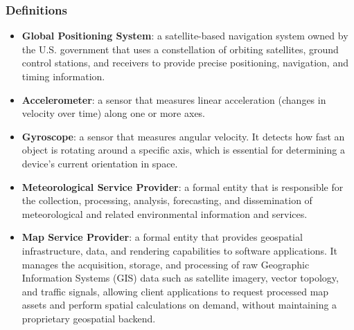 \subsubsection{Definitions}
\begin{itemize}
    \item \textbf{Global Positioning System}: a satellite-based navigation system owned by the U.S. government that uses a constellation of orbiting satellites, ground control stations, and receivers to provide precise positioning, navigation, and timing information.
    \item \textbf{Accelerometer}: a sensor that measures linear acceleration (changes in velocity over time) along one or more axes.
    \item \textbf{Gyroscope}: a sensor that measures angular velocity. It detects how fast an object is rotating around a specific axis, which is essential for determining a device’s current orientation in space.
    \item \textbf{Meteorological Service Provider}: a formal entity that is responsible for the collection, processing, analysis, forecasting, and dissemination of meteorological and related environmental information and services.
    \item \textbf{Map Service Provider}: a formal entity that provides geospatial infrastructure, data, and rendering capabilities to software applications. It manages the acquisition, storage, and processing of raw Geographic Information Systems (GIS) data such as satellite imagery, vector topology, and traffic signals, allowing client applications to request processed map assets and perform spatial calculations on demand, without maintaining a proprietary geospatial backend.
\end{itemize}

